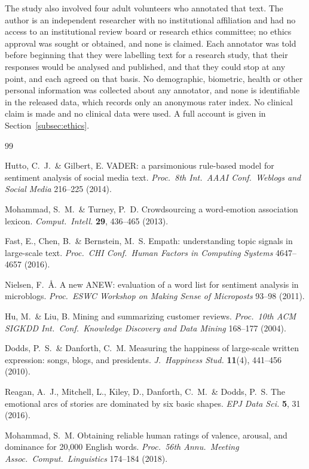 \documentclass[fleqn,10pt]{wlscirep}
\begin{document}
The study also involved four adult volunteers who annotated that text. The
author is an independent researcher with no institutional affiliation and had no
access to an institutional review board or research ethics committee; no ethics
approval was sought or obtained, and none is claimed. Each annotator was told
before beginning that they were labelling text for a research study, that their
responses would be analysed and published, and that they could stop at any
point, and each agreed on that basis. No demographic, biometric, health or other
personal information was collected about any annotator, and none is identifiable
in the released data, which records only an anonymous rater index. No clinical
claim is made and no clinical data were used. A full account is given in
Section~\ref{subsec:ethics}.

\begin{thebibliography}{99}

Hutto, C.\ J.\ \& Gilbert, E.
VADER: a parsimonious rule-based model for sentiment analysis of social media text.
\emph{Proc.\ 8th Int.\ AAAI Conf.\ Weblogs and Social Media} 216--225 (2014).

Mohammad, S.\ M.\ \& Turney, P.\ D.
Crowdsourcing a word-emotion association lexicon.
\emph{Comput.\ Intell.} \textbf{29}, 436--465 (2013).

Fast, E., Chen, B.\ \& Bernstein, M.\ S.
Empath: understanding topic signals in large-scale text.
\emph{Proc.\ CHI Conf.\ Human Factors in Computing Systems} 4647--4657 (2016).

Nielsen, F.\ {\AA}.
A new ANEW: evaluation of a word list for sentiment analysis in microblogs.
\emph{Proc.\ ESWC Workshop on Making Sense of Microposts} 93--98 (2011).

Hu, M.\ \& Liu, B.
Mining and summarizing customer reviews.
\emph{Proc.\ 10th ACM SIGKDD Int.\ Conf.\ Knowledge Discovery and Data Mining} 168--177 (2004).

Dodds, P.\ S.\ \& Danforth, C.\ M.
Measuring the happiness of large-scale written expression: songs, blogs, and presidents.
\emph{J.\ Happiness Stud.} \textbf{11}(4), 441--456 (2010).

Reagan, A.\ J., Mitchell, L., Kiley, D., Danforth, C.\ M.\ \& Dodds, P.\ S.
The emotional arcs of stories are dominated by six basic shapes.
\emph{EPJ Data Sci.} \textbf{5}, 31 (2016).

Mohammad, S.\ M.
Obtaining reliable human ratings of valence, arousal, and dominance for 20,000 English words.
\emph{Proc.\ 56th Annu.\ Meeting Assoc.\ Comput.\ Linguistics} 174--184 (2018).


\end{thebibliography}
\end{document}
